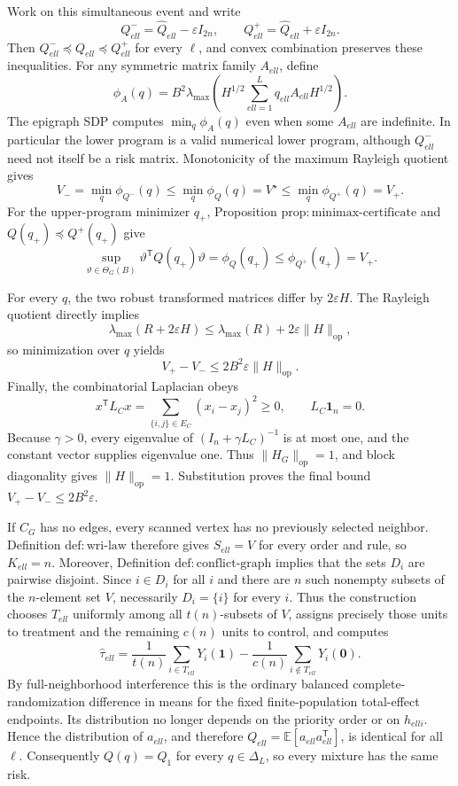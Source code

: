 Work on this simultaneous event and write
\[
 Q_{ell}^{-}=\widehat Q_{ell}-\varepsilon I_{2n},
 \qquad
 Q_{ell}^{+}=\widehat Q_{ell}+\varepsilon I_{2n}.
\]
Then \(Q_{ell}^{-}\preceq Q_{ell}\preceq Q_{ell}^{+}\) for every \(\ell\), and convex combination preserves these inequalities.  For any symmetric matrix family \(A_{ell}\), define
\[
 \phi_A(q)=B^2\lambda_{\max}\!\left(H^{1/2}\sum_{ell=1}^Lq_{ell}A_{ell}H^{1/2}\right).
\]
The epigraph SDP computes \(\min_q\phi_A(q)\) even when some \(A_{ell}\) are indefinite.  In particular the lower program is a valid numerical lower program, although \(Q_{ell}^{-}\) need not itself be a risk matrix.  Monotonicity of the maximum Rayleigh quotient gives
\[
 V_- =\min_q\phi_{Q^-}(q)
 \le\min_q\phi_Q(q)=V^{\star}
 \le\min_q\phi_{Q^+}(q)=V_+.
\]
For the upper-program minimizer \(q_+\), Proposition \(\mathrm{prop:minimax\mbox{-}certificate}\) and \(Q(q_+)\preceq Q^+(q_+)\) give
\[
 \sup_{\vartheta\in\Theta_G(B)}
 \vartheta^{\mathsf T}Q(q_+)\vartheta
 =\phi_Q(q_+)
 \le\phi_{Q^+}(q_+)=V_+.
\]

For every \(q\), the two robust transformed matrices differ by \(2\varepsilon H\).  The Rayleigh quotient directly implies
\[
 \lambda_{\max}(R+2\varepsilon H)
 \le\lambda_{\max}(R)+2\varepsilon\|H\|_{\mathrm{op}},
\]
so minimization over \(q\) yields
\[
 V_+-V_-
 \le2B^2\varepsilon\|H\|_{\mathrm{op}}.
\]
Finally, the combinatorial Laplacian obeys
\[
 x^{\mathsf T}L_Cx=\sum_{\{i,j\}\in E_C}(x_i-x_j)^2\ge0,
 \qquad L_C\mathbf 1_n=0.
\]
Because \(\gamma>0\), every eigenvalue of \((I_n+\gamma L_C)^{-1}\) is at most one, and the constant vector supplies eigenvalue one.  Thus \(\|H_G\|_{\mathrm{op}}=1\), and block diagonality gives \(\|H\|_{\mathrm{op}}=1\).  Substitution proves the final bound \(V_+-V_-\le2B^2\varepsilon\).

If \(C_G\) has no edges, every scanned vertex has no previously selected neighbor.  Definition \(\mathrm{def:wri\mbox{-}law}\) therefore gives \(S_{ell}=V\) for every order and rule, so \(K_{ell}=n\).  Moreover, Definition \(\mathrm{def:conflict\mbox{-}graph}\) implies that the sets \(D_i\) are pairwise disjoint.  Since \(i\in D_i\) for all \(i\) and there are \(n\) such nonempty subsets of the \(n\)-element set \(V\), necessarily \(D_i=\{i\}\) for every \(i\).  Thus the construction chooses \(T_{ell}\) uniformly among all \(t(n)\)-subsets of \(V\), assigns precisely those units to treatment and the remaining \(c(n)\) units to control, and computes
\[
 \widehat\tau_{ell}
 =\frac1{t(n)}\sum_{i\in T_{ell}}Y_i(\mathbf 1)
  -\frac1{c(n)}\sum_{i\notin T_{ell}}Y_i(\mathbf 0).
\]
By full-neighborhood interference this is the ordinary balanced complete-randomization difference in means for the fixed finite-population total-effect endpoints.  Its distribution no longer depends on the priority order or on \(h_{ell i}\).  Hence the distribution of \(a_{ell}\), and therefore \(Q_{ell}=\mathbb E[a_{ell}a_{ell}^{\mathsf T}]\), is identical for all \(\ell\).  Consequently \(Q(q)=Q_1\) for every \(q\in\Delta_L\), so every mixture has the same risk.

